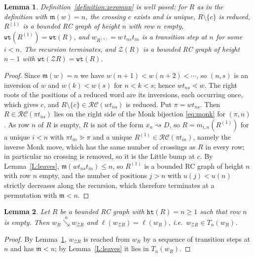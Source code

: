 \documentclass{amsart}
\newtheorem{lemma}{Lemma}[subsection]
\theoremstyle{definition}
\theoremstyle{remark}
\numberwithin{equation}{subsection}
\newcommand{\downvar}[1]{\stackrel{#1}{\searrow}}
\newcommand{\wof}[1]{w_{#1}}
\newcommand{\wtt}{\mathtt{wt}}
\newcommand{\zeromap}{\mathcal{Z}}
\newcommand{\hr}{\mathtt{ht}}
\newcommand{\RC}{\mathcal{RC}}
\newcommand{\maxd}{\mathfrak{m}}
\begin{document}
\begin{lemma}\label{lemma:zeroweight}
Definition~\ref{definition:zeromap} is well posed: for $R$ as in the definition with $\maxd(w)=n$, the crossing $c$ exists and is unique, $R\setminus\{c\}$ is reduced, $R^{(1)}$ is a bounded RC graph of height $n$ with row $n$ empty, $\wtt(R^{(1)})=\wtt(R)$, and $\wof{R^{(1)}}=w\,t_{ns}t_{in}$ is a transition step at $n$ for some $i<n$. The recursion terminates, and $\zeromap(R)$ is a bounded RC graph of height $n-1$ with $\wtt(\zeromap R)=\wtt(R)$.
\end{lemma}
\begin{proof}
Since $\maxd(w)=n$ we have $w(n+1)<w(n+2)<\cdots$, so $(n,s)$ is an inversion of $w$ and $w(k)<w(s)$ for $n<k<s$; hence $wt_{ns}\lessdot w$. The right roots of the positions of a reduced word are its inversions, each occurring once, which gives $c$, and $R\setminus\{c\}\in\RC(wt_{ns})$ is reduced. Put $\pi=wt_{ns}$. Then $R\in\RC(\pi t_{ns})$ lies on the right side of the Monk bijection \eqref{eq:monk} for $(\pi,n)$. As row $n$ of $R$ is empty, $R$ is not of the form $x_n\!\rightsquigarrow D$, so $R=m_{i,n}(R^{(1)})$ for a unique $i<n$ with $\pi t_{in}\gtrdot\pi$ and a unique $R^{(1)}\in\RC(\pi t_{in})$, namely the inverse Monk move, which has the same number of crossings as $R$ in every row; in particular no crossing is removed, so it is the Little bump at $c$. By Lemma~\ref{L:leaves}, $\maxd(wt_{ns}t_{in})\leq n$, so $R^{(1)}$ is a bounded RC graph of height $n$ with row $n$ empty, and the number of positions $j>n$ with $u(j)<u(n)$ strictly decreases along the recursion, which therefore terminates at a permutation with $\maxd<n$.
\end{proof}

\begin{lemma} \label{lemma:zerotransition}
Let $R$ be a bounded RC graph with $\hr(R)=n\geq 1$ such that row $n$ is empty. Then $\wof{R}\downvar{n}\wof{\zeromap R}$ and $\ell(\wof{\zeromap R})=\ell(\wof R)$, i.e.\ $\wof{\zeromap R}\in T_n(\wof R)$.
\end{lemma}
\begin{proof}
By Lemma~\ref{lemma:zeroweight}, $\wof{\zeromap R}$ is reached from $\wof R$ by a sequence of transition steps at $n$ and has $\maxd<n$; by Lemma~\ref{L:leaves} it lies in $T_n(\wof R)$.
\end{proof}
\end{document}
